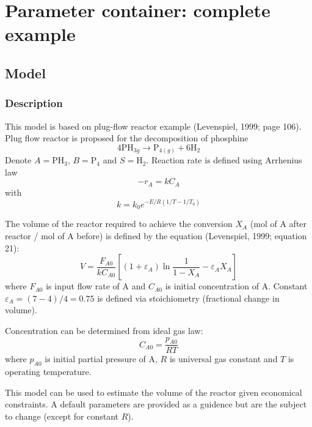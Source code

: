 \documentclass[listings, a4paper, fleqn, pdftex, 12pt, openany, oneside, final]{memoir}
\date{\today}
\title{}
\theoremstyle{definition}
\begin{document}
\tableofcontents

\chapter{Parameter container: complete example}
\label{sec:orgheadline9}
\section{Model}
\label{sec:orgheadline6}
\subsection{Description}
\label{sec:orgheadline1}
This model is based on plug-flow reactor example (Levenspiel, 1999;
page 106). Plug flow reactor is proposed for the decomposition of
phosphine
\begin{equation*}
4\mathrm{PH}_{3g }\to \mathrm{P}_{4(g)} + 6\mathrm{H}_{2}
\end{equation*}
Denote \(A = \mathrm{PH}_{3}\), \(B = \mathrm{P}_{4}\) and \(S =
\mathrm{H}_{2}\). Reaction rate is defined using Arrhenius law
\begin{equation}
-r_{A}=kC_{A}
\end{equation}
with
\begin{equation}
k=k_{0} e^{-E/R(1/T-1/T_{0})}
\end{equation}

The volume of the reactor required to achieve the conversion \(X_{A}\) (mol
of A after reactor / mol of A before) is defined by the equation
(Levenspiel, 1999; equation 21):
\begin{equation}
V=\frac{F_{A0}}{kC_{A0}}\left[(1+\varepsilon_{A})\ln{\frac{1}{1-X_{A}}} -\varepsilon_{A}X_{A}\right]
\end{equation}
where \(F_{A0}\) is input flow rate of A and \(C_{A0}\) is initial concentration
of A. Constant \(\varepsilon_{A}=(7-4)/4=0.75\) is defined via stoichiometry
(fractional change in volume).

Concentration can be determined from ideal gas law:
\begin{equation}
C_{A0}=\frac{p_{A0}}{RT}
\end{equation}
where \(p_{A0}\) is initial partial pressure of A, \(R\) is universal gas
constant and \(T\) is operating temperature.

This model can be used to estimate the volume of the reactor given
economical constraints. A default parameters are provided as a
guidence but are the subject to change (except for constant \(R\)).
\end{document}
